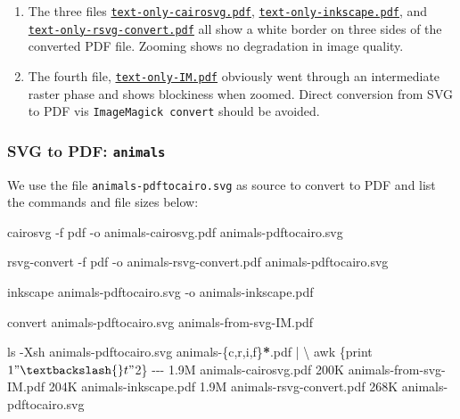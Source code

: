 \documentclass[
  11pt,
  british,
  a4paper,
]{article}
\newenvironment{Shaded}{\begin{snugshade}}{\end{snugshade}}
\newcommand{\AttributeTok}[1]{\textcolor[rgb]{0.80,0.80,0.80}{#1}}
\newcommand{\DataTypeTok}[1]{\textcolor[rgb]{0.87,0.87,0.75}{#1}}
\newcommand{\ExtensionTok}[1]{\textcolor[rgb]{0.80,0.80,0.80}{#1}}
\newcommand{\FunctionTok}[1]{\textcolor[rgb]{0.94,0.94,0.56}{#1}}
\newcommand{\KeywordTok}[1]{\textcolor[rgb]{0.94,0.87,0.69}{#1}}
\newcommand{\NormalTok}[1]{\textcolor[rgb]{0.80,0.80,0.80}{#1}}
\newcommand{\OperatorTok}[1]{\textcolor[rgb]{0.94,0.94,0.82}{#1}}
\newcommand{\PreprocessorTok}[1]{\textcolor[rgb]{1.00,0.81,0.69}{\textbf{#1}}}
\newcommand{\StringTok}[1]{\textcolor[rgb]{0.80,0.58,0.58}{#1}}
\begin{document}
\begin{enumerate}
\def\labelenumi{\alph{enumi}.}
\item
  The three files \href{attach}{\texttt{text-only-cairosvg.pdf}},
  \href{images/text-only-inkscape.pdf}{\texttt{text-only-inkscape.pdf}},
  and
  \href{images/text-only-rsvg-convert.pdf}{\texttt{text-only-rsvg-convert.pdf}}
  all show a white border on three sides of the converted PDF file.
  Zooming shows no degradation in image quality.
\item
  The fourth file,
  \href{images/text-only-IM.pdf}{\texttt{text-only-IM.pdf}} obviously
  went through an intermediate raster phase and shows blockiness when
  zoomed. Direct conversion from SVG to PDF vis
  \texttt{ImageMagick\ convert} should be avoided.
\end{enumerate}

\hypertarget{svg-to-pdf-animals}{%
\subsubsection{\texorpdfstring{SVG to PDF:
\texttt{animals}}{SVG to PDF: animals}}\label{svg-to-pdf-animals}}

We use the file \texttt{animals-pdftocairo.svg} as source to convert to
PDF and list the commands and file sizes below:

\begin{Shaded}
\begin{Highlighting}[]
\ExtensionTok{cairosvg} \AttributeTok{{-}f}\NormalTok{ pdf }\AttributeTok{{-}o}\NormalTok{ animals{-}cairosvg.pdf animals{-}pdftocairo.svg}

\ExtensionTok{rsvg{-}convert} \AttributeTok{{-}f}\NormalTok{ pdf }\AttributeTok{{-}o}\NormalTok{ animals{-}rsvg{-}convert.pdf animals{-}pdftocairo.svg}

\ExtensionTok{inkscape}\NormalTok{ animals{-}pdftocairo.svg }\AttributeTok{{-}o}\NormalTok{ animals{-}inkscape.pdf}

\ExtensionTok{convert}\NormalTok{ animals{-}pdftocairo.svg animals{-}from{-}svg{-}IM.pdf}

\FunctionTok{ls} \AttributeTok{{-}Xsh}\NormalTok{ animals{-}pdftocairo.svg animals{-}}\DataTypeTok{\{c}\OperatorTok{,}\DataTypeTok{r}\OperatorTok{,}\DataTypeTok{i}\OperatorTok{,}\DataTypeTok{f\}}\PreprocessorTok{*}\NormalTok{.pdf }\KeywordTok{|} \DataTypeTok{\textbackslash{}}
\FunctionTok{awk} \StringTok{\textquotesingle{}\{print $1 "\textbackslash{}t" $2\}\textquotesingle{}}
\ExtensionTok{{-}{-}{-}}
\ExtensionTok{1.9M}\NormalTok{    animals{-}cairosvg.pdf}
\ExtensionTok{200K}\NormalTok{    animals{-}from{-}svg{-}IM.pdf}
\ExtensionTok{204K}\NormalTok{    animals{-}inkscape.pdf}
\ExtensionTok{1.9M}\NormalTok{    animals{-}rsvg{-}convert.pdf}
\ExtensionTok{268K}\NormalTok{    animals{-}pdftocairo.svg}
\end{Highlighting}
\end{Shaded}
\end{document}
